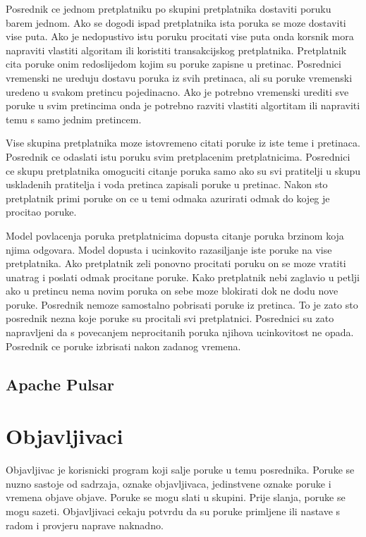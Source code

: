 \documentclass[times, utf8, diplomski, numeric]{fer}
\begin{document}
Posrednik ce jednom pretplatniku po skupini pretplatnika dostaviti poruku barem jednom. Ako se dogodi ispad pretplatnika ista poruka se moze dostaviti vise puta. Ako je nedopustivo istu poruku procitati vise puta onda korsnik mora napraviti vlastiti algoritam ili koristiti transakcijskog pretplatnika. Pretplatnik cita poruke onim redoslijedom kojim su poruke zapisne u pretinac. Posrednici vremenski ne ureduju dostavu poruka iz svih pretinaca, ali su poruke vremenski uredeno u svakom pretincu pojedinacno. Ako je potrebno vremenski urediti sve poruke u svim pretincima onda je potrebno razviti vlastiti algortitam ili napraviti temu s samo jednim pretincem.

Vise skupina pretplatnika moze istovremeno citati poruke iz iste teme i pretinaca. Posrednik ce odaslati istu poruku svim pretplacenim pretplatnicima. Posrednici ce skupu pretplatnika omoguciti citanje poruka samo ako su svi pratitelji u skupu uskladenih pratitelja i voda pretinca zapisali poruke u pretinac. Nakon sto pretplatnik primi poruke on ce u temi odmaka azurirati odmak do kojeg je procitao poruke.

Model povlacenja poruka pretplatnicima dopusta citanje poruka brzinom koja njima odgovara. Model dopusta i ucinkovito razasiljanje iste poruke na vise pretplatnika. Ako pretplatnik zeli ponovno procitati poruku on se moze vratiti unatrag i poslati odmak procitane poruke. Kako pretplatnik nebi zaglavio u petlji ako u pretincu nema novim poruka on sebe moze blokirati dok ne dodu nove poruke. Posrednik nemoze samostalno pobrisati poruke iz pretinca. To je zato sto posrednik nezna koje poruke su procitali svi pretplatnici. Posrednici su zato napravljeni da s povecanjem neprocitanih poruka njihova ucinkovitost ne opada. Posrednik ce poruke izbrisati nakon zadanog vremena.



\section{Apache Pulsar}



\chapter{Objavljivaci}
Objavljivac je korisnicki program koji salje poruke u temu posrednika. Poruke se nuzno sastoje od sadrzaja, oznake objavljivaca, jedinstvene oznake poruke i vremena objave objave. Poruke se mogu slati u skupini. Prije slanja, poruke se mogu sazeti. Objavljivaci cekaju potvrdu da su poruke primljene ili nastave s radom i provjeru naprave naknadno. 
\end{document}
